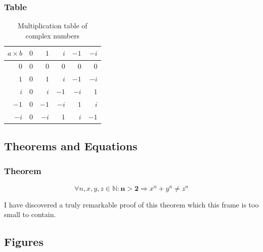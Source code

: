 \documentclass[aspectratio=169]{beamer}
\begin{document}
\begin{frame}
\frametitle{Table}


\begin{table} 
\caption{Multiplication table of complex numbers}
\begin{tabular}{r | r r r r r} 
$a \times b$ & $0$ &  $1$ &  $i$ & $-1$ & $-i$ \\ \hline
         $0$ & $0$ &  $0$ &  $0$ &  $0$ &  $0$ \\
         $1$ & $0$ &  $1$ &  $i$ & $-1$ & $-i$ \\
         $i$ & $0$ &  $i$ & $-1$ & $-i$ &  $1$ \\
        $-1$ & $0$ & $-1$ & $-i$ &  $1$ &  $i$ \\
        $-i$ & $0$ & $-i$ &  $1$ &  $i$ & $-1$ \\
\end{tabular}
\end{table}
\end{frame}


\subsection{Theorems and Equations}


\begin{frame}
\frametitle{Theorem}
\begin{theorem}
\begin{equation}
    \forall n, x, y, z \in \mathbb{N}: \mathbf{n > 2} \Rightarrow x^n + y^n \neq z^n
\end{equation}
\end{theorem}
I have discovered a truly remarkable proof of this theorem which this frame is too small to contain.
\end{frame}


\subsection{Figures}
\end{document}
